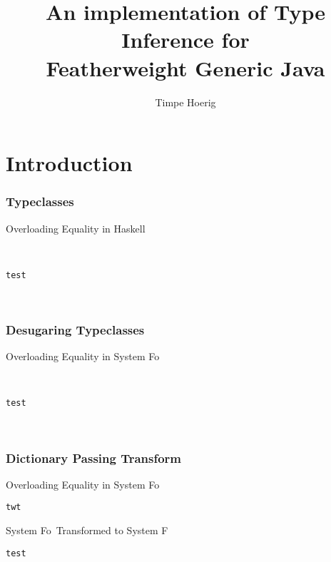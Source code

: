 \documentclass[aspectratio=169]{beamer}
\title[Global Type Inference for FGJ]{An implementation of Type Inference for\\Featherweight Generic Java}
\author{Timpe Hoerig}
\begin{document}
\begin{frame}
  \titlepage
\end{frame}

\section{Introduction}

\begin{frame}[fragile]
  \frametitle{Typeclasses}
  \begin{block}{Overloading Equality in Haskell}
    \begin{center}
      ~
      \begin{verbatim}
test
      \end{verbatim}
      ~
    \end{center}
  \end{block}
\end{frame}

\begin{frame}[fragile]
  \frametitle{Desugaring Typeclasses}
  \begin{block}{Overloading Equality in System Fo}
    \begin{center}
      ~
      \begin{verbatim}
test
      \end{verbatim}
      ~
    \end{center}
  \end{block}
\end{frame}

\begin{frame}[fragile]
  \frametitle{Dictionary Passing Transform}
  \begin{block}{Overloading Equality in System Fo\ }
    \begin{center}
      \begin{verbatim}
twt
      \end{verbatim}
    \end{center}
  \end{block}
  \begin{block}{System Fo\ Transformed to System F}
    \begin{center}
      \begin{verbatim}
test
      \end{verbatim}
    \end{center}
  \end{block}
\end{frame}
\end{document}
